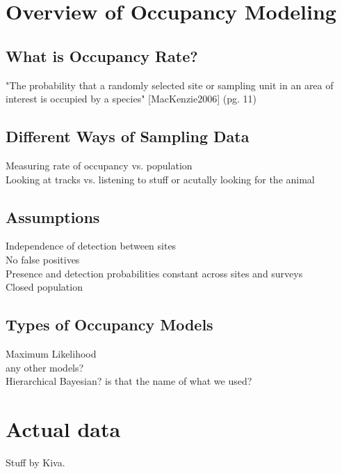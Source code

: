 \documentclass{article}
\begin{document}
\section{Overview of Occupancy Modeling}
	\subsection{What is Occupancy Rate?}
		"The probability that a randomly selected site or sampling unit in an area 
			of interest is occupied by a species" [MacKenzie2006] (pg. 11)
	\subsection{Different Ways of Sampling Data}
		Measuring rate of occupancy vs. population \\
		Looking at tracks vs. listening to stuff or acutally looking for the animal
	\subsection{Assumptions}
		Independence of detection between sites \\
		No false positives \\
		Presence and detection probabilities constant across sites and surveys \\
		Closed population
	\subsection{Types of Occupancy Models}
		Maximum Likelihood \\
		any other models? \\
		Hierarchical Bayesian?  is that the name of what we used?

\section{Actual data}
Stuff by Kiva.
\end{document}
